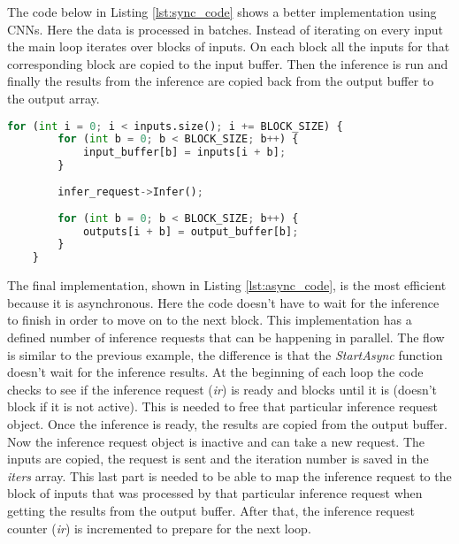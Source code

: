The code below in Listing \ref{lst:sync_code} shows a better implementation using CNNs. Here the data is processed in batches. Instead of iterating on every input the main loop iterates over blocks of inputs. On each block all the inputs for that corresponding block are copied to the input buffer. Then the inference is run and finally the results from the inference are copied back from the output buffer to the output array.

\begin{minipage}{\linewidth}
\begin{lstlisting}[frame=single, tabsize=4, caption={Algorithmic transformation of an error tolerant-function in batches using OpenVINO.},label={lst:sync_code},language=Python,captionpos=b]
	for (int i = 0; i < inputs.size(); i += BLOCK_SIZE) {
		for (int b = 0; b < BLOCK_SIZE; b++) {
			input_buffer[b] = inputs[i + b];
		}
		
		infer_request->Infer();
		
		for (int b = 0; b < BLOCK_SIZE; b++) {
			outputs[i + b] = output_buffer[b];
		}
	}
\end{lstlisting}
\end{minipage}

The final implementation, shown in Listing \ref{lst:async_code}, is the most efficient because it is asynchronous. Here the code doesn't have to wait for the inference to finish in order to move on to the next block. This implementation has a defined number of inference requests that can be happening in parallel. The flow is similar to the previous example, the difference is that the \textit{StartAsync} function doesn't wait for the inference results. At the beginning of each loop the code checks to see if the inference request (\textit{ir}) is ready and blocks until it is (doesn't block if it is not active). This is needed to free that particular inference request object. Once the inference is ready, the results are copied from the output buffer. Now the inference request object is inactive and can take a new request. The inputs are copied, the request is sent and the iteration number is saved in the \textit{iters} array. This last part is needed to be able to map the inference request to the block of inputs that was processed by that particular inference request when getting the results from the output buffer. After that, the inference request counter (\textit{ir}) is incremented to prepare for the next loop.

